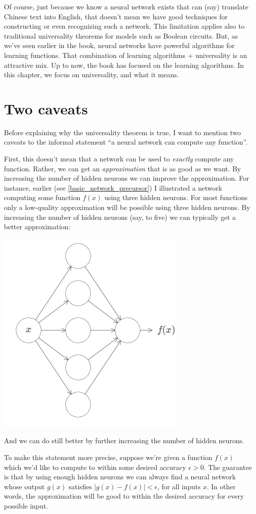 \documentclass[a4paper,twoside,10pt]{book}
\begin{document}
Of course, just because we know a neural network exists that can (say) translate Chinese text into English, that doesn't mean we have good techniques for constructing or even recognizing such a network. This limitation applies also to traditional universality theorems for models such as Boolean circuits. But, as we've seen earlier in the book, neural networks have powerful algorithms for learning functions. That combination of learning algorithms + universality is an attractive mix. Up to now, the book has focused on the learning algorithms. In this chapter, we focus on universality, and what it means.


\section{Two caveats}
Before explaining why the universality theorem is true, I want to mention two caveats to the informal statement ``a neural network can compute any function''.

First, this doesn't mean that a network can be used to \textit{exactly} compute any function. Rather, we can get an \textit{approximation} that is as good as we want. By increasing the number of hidden neurons we can improve the approximation. For instance, earlier (see \ref{basic_network_precursor}) I illustrated a network computing some function $f(x)$ using three hidden neurons. For most functions only a low-quality approximation will be possible using three hidden neurons. By increasing the number of hidden neurons (say, to five) we can typically get a better approximation:
\begin{center}
	\includegraphics[width=0.43\linewidth]{figures/ch4/tikz402}
\end{center}
And we can do still better by further increasing the number of hidden neurons.

To make this statement more precise, suppose we're given a function $f(x)$ which we'd like to compute to within some desired accuracy $\epsilon>0$. The guarantee is that by using enough hidden neurons we can always find a neural network whose output $g(x)$ satisfies $|g(x)-f(x)|<\epsilon$, for all inputs $x$. In other words, the approximation will be good to within the desired accuracy for every possible input.
\end{document}
